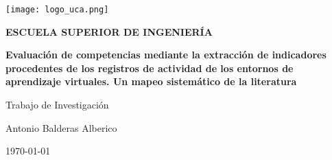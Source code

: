 

\begin{titlepage}

  \begin{center}

    \texttt{[image: logo\_uca.png]} \\
    
    \vspace{2.0cm}
    
    \LARGE{\textbf{ESCUELA SUPERIOR DE INGENIERÍA}} \\
    
    \vspace{1.0cm}
    
    \Large{\textbf{Evaluación de competencias mediante la extracción de indicadores procedentes de los registros de actividad de los entornos de aprendizaje virtuales. Un mapeo sistemático de la literatura}} \\
    
    \vspace{3.0cm}
    
    \Large{Trabajo de Investigación} \\
    
    \vspace{2.0cm}
    
    \Large{Antonio Balderas Alberico} \\
  
    \vspace{0.5cm}

    \large{\today}
    
  \end{center}
\end{titlepage}
